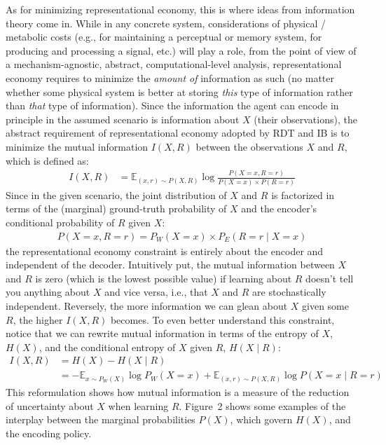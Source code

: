 \documentclass[nobib,nofonts]{tufte-handout}
\begin{document}
As for minimizing representational economy, this is where ideas from information theory come in.
While in any concrete system, considerations of physical / metabolic costs (e.g., for maintaining a perceptual or memory system, for producing and processing a signal, etc.) will play a role, from the point of view of a mechanism-agnostic, abstract, computational-level analysis, representational economy requires to minimize the \textit{amount of} information as such (no matter whether some physical system is better at storing \textit{this} type of information rather than \textit{that} type of information).
Since the information the agent can encode in principle in the assumed scenario is information about $X$ (their observations), the abstract requirement of representational economy adopted by RDT and IB is to minimize the mutual information $I(X,R)$ between the observations $X$ and $R$, which is defined as:
\begin{align*}
  I(X,R)
  & = \mathbb{E}_{(x,r) \sim P(X,R)} \log \frac{P(X=x, R=r)}{P(X=x) \times P(R=r)}
\end{align*}
Since in the given scenario, the joint distribution of $X$ and $R$ is factorized in terms of the (marginal) ground-truth probability of $X$ and the encoder's conditional probability of $R$ given $X$:
\begin{align*}
  P(X=x, R=r) = P_{W}(X=x) \times P_{E}(R=r \mid X=x)
\end{align*}
the representational economy constraint is entirely about the encoder and independent of the decoder.
Intuitively put, the mutual information between $X$ and $R$ is zero (which is the lowest possible value) if learning about $R$ doesn't tell you anything about $X$ and vice versa, i.e., that $X$ and $R$ are stochastically independent.
Reversely, the more information we can glean about $X$ given some $R$, the higher $I(X,R)$ becomes.
To even better understand this constraint, notice that we can rewrite mutual information in terms of  the entropy of $X$, $H(X)$, and the conditional entropy of $X$ given $R$, $H(X \mid R)$:
\begin{align*}
  I(X,R) & = H(X) - H(X \mid R) \\
  & = - \mathbb{E}_{x \sim P_{W}(X)} \log P_{W}(X=x) + \mathbb{E}_{(x,r) \sim P(X,R)} \log P(X=x \mid R=r)
\end{align*}
This reformulation shows how mutual information is a measure of the reduction of uncertainty about $X$ when learning $R$.
Figure~2 shows some examples of the interplay between the marginal probabilities $P(X)$, which govern $H(X)$, and the encoding policy.
\end{document}
